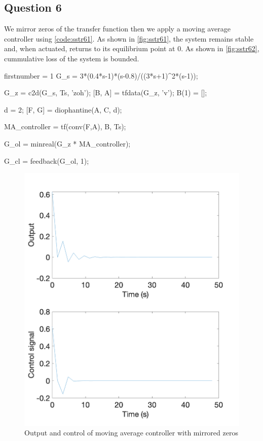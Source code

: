 \FloatBarrier
\subsection{Question 6}
We mirror zeros of the transfer function then we apply a moving average controller using \autoref{code:sstr61}. As shown in \autoref{fig:sstr61}, the system remains stable and, when actuated, returns to its equilibrium point at $0$. As shown in \autoref{fig:sstr62}, cummulative loss of the system is bounded.

\begin{code}
	\begin{matlabcode}{firstnumber = 1}
G_s = 3*(0.4*s-1)*(s-0.8)/((3*s+1)^2*(s-1));

G_z = c2d(G_s, Ts, 'zoh');
[B, A] = tfdata(G_z, 'v');
B(1) = [];  

d = 2;  %
[F, G] = diophantine(A, C, d);

MA_controller = tf(conv(F,A), B, Ts);

G_ol = minreal(G_z * MA_controller);

G_cl = feedback(G_ol, 1);

	\end{matlabcode}
	\label{code:sstr61}
\end{code}

\begin{figure}
	\centering
	\includegraphics[width=\textwidth]{images/sstr61.png}
	\caption{Output and control of moving average controller with mirrored zeros}
	\label{fig:sstr61}
\end{figure}

